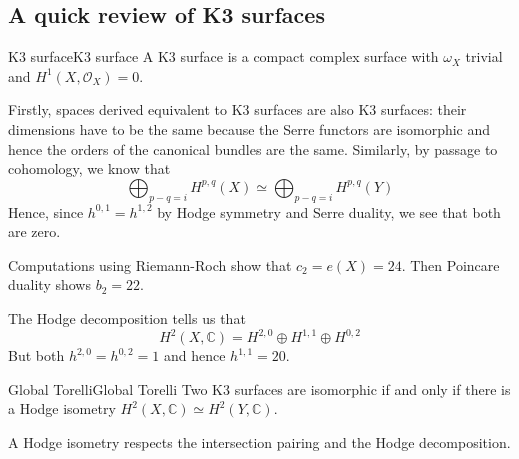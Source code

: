 \subsection{A quick review of K3 surfaces}
\begin{definition}{K3 surface}{K3 surface}
A K3 surface is a compact complex surface with $\omega_{X}$ trivial and $H^1(X,\mathcal{O}_{X})=0$.
\end{definition}

Firstly, spaces derived equivalent to K3 surfaces are also K3 surfaces: their dimensions have to be the same because the Serre functors are isomorphic and hence the orders of the canonical bundles are the same. Similarly, by passage to cohomology, we know that $$\bigoplus_{p-q=i}H^{p,q}(X)\simeq \bigoplus_{p-q=i}H^{p,q}(Y)$$
Hence, since $h^{0,1}=h^{1,2}$ by Hodge symmetry and Serre duality, we see that both are zero.

Computations using Riemann-Roch show that $c_2=e(X)=24$. Then Poincare duality shows $b_2=22$. 

The Hodge decomposition tells us that $$H^2(X,\mathbb{C})=H^{2,0}\oplus H^{1,1}\oplus H^{0,2}$$But both $h^{2,0}=h^{0,2}=1$ and hence $h^{1,1}=20$. 

\begin{theorem}{Global Torelli}{Global Torelli}
Two K3 surfaces are isomorphic if and only if there is a Hodge isometry $H^2(X,\mathbb{C})\simeq H^2(Y,\mathbb{C})$.
\end{theorem}

A Hodge isometry respects the intersection pairing and the Hodge decomposition. 

 



